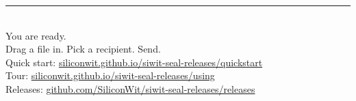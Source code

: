 \documentclass[aspectratio=169,11pt]{beamer}
\newcommand{\releasesurl}{https://github.com/SiliconWit/siwit-seal-releases/releases}
\newcommand{\docsurl}{https://siliconwit.github.io/siwit-seal-releases/}
\begin{document}
\begin{frame}[plain]
  \vspace*{1.2cm}
  \begin{center}
    {\color{swTealDark}\rule{3em}{4pt}}\\[1.0em]
    {You are ready.}\\[1.0em]
    {Drag a file in. Pick a recipient. Send.}\\[2em]
    {\small Quick start: \href{\docsurl quickstart/}{siliconwit.github.io/siwit-seal-releases/quickstart}}\\[0.4em]
    {\small Tour: \href{\docsurl using/}{siliconwit.github.io/siwit-seal-releases/using}}\\[0.4em]
    {\small Releases: \href{\releasesurl}{github.com/SiliconWit/siwit-seal-releases/releases}}
  \end{center}
\end{frame}
\end{document}
